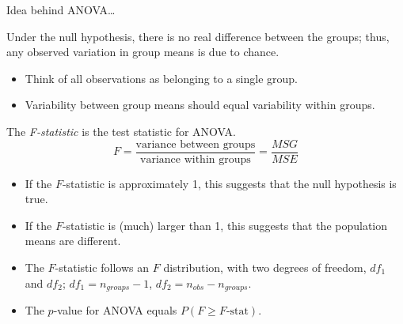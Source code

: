\documentclass[
  ignorenonframetext,
  aspectratio=169]{beamer}
\begin{document}
\begin{frame}{Idea behind ANOVA\ldots{}}
\protect\hypertarget{idea-behind-anova-2}{}
\footnotesize

Under the null hypothesis, there is no real difference between the
groups; thus, any observed variation in group means is due to chance.

\begin{itemize}
\item
  Think of all observations as belonging to a single group.
\item
  Variability between group means should equal variability within
  groups.
\end{itemize}

The \textit{F-statistic} is the test statistic for ANOVA.
\[F = \frac{\text{variance between groups}}{\text{variance within groups}}  = \frac{MSG}{MSE}\]

\begin{itemize}
\item
  If the \(F\)-statistic is approximately 1, this suggests that the null
  hypothesis is true.
\item
  If the \(F\)-statistic is (much) larger than 1, this suggests that the
  population means are different.
\item
  The \(F\)-statistic follows an \(F\) distribution, with two degrees of
  freedom, \(df_1\) and \(df_2\); \(df_1 = n_{groups} - 1\),
  \(df_2 = n_{obs} - n_{groups}\).
\item
  The \(p\)-value for ANOVA equals \(P(F \geq F\text{-stat})\).
\end{itemize}
\end{frame}
\end{document}
